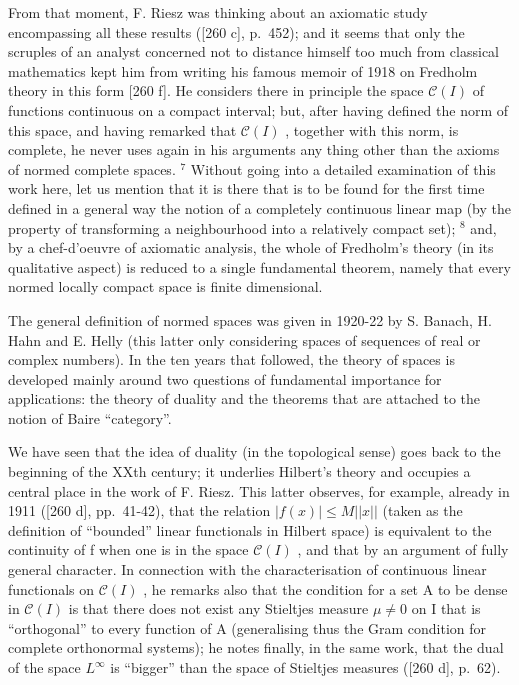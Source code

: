 From that moment, F. Riesz was thinking about an axiomatic study encompassing all these results ({[}260 c{]}, p.~452); and it seems that only the scruples of an analyst concerned not to distance himself too much from classical mathematics kept him from writing his famous memoir of 1918 on Fredholm theory in this form {[}260 f{]}. He considers there in principle the space \(\mathcal{C}(I)\) of functions continuous on a compact interval; but, after having defined the norm of this space, and having remarked that \(\mathcal{C}(I)\) , together with this norm, is complete, he never uses again in his arguments any thing other than the axioms of normed complete spaces. \(^{7}\) Without going into a detailed examination of this work here, let us mention that it is there that is to be found for the first time defined in a general way the notion of a completely continuous linear map (by the property of transforming a neighbourhood into a relatively compact set); \(^{8}\) and, by a chef-d'oeuvre of axiomatic analysis, the whole of Fredholm's theory (in its qualitative aspect) is reduced to a single fundamental theorem, namely that every normed locally compact space is finite dimensional.

The general definition of normed spaces was given in 1920-22 by S. Banach, H. Hahn and E. Helly (this latter only considering spaces of sequences of real or complex numbers). In the ten years that followed, the theory of spaces is developed mainly around two questions of fundamental importance for applications: the theory of duality and the theorems that are attached to the notion of Baire ``category''.

We have seen that the idea of duality (in the topological sense) goes back to the beginning of the XXth century; it underlies Hilbert's theory and occupies a central place in the work of F. Riesz. This latter observes, for example, already in 1911 ({[}260 d{]}, pp.~41-42), that the relation \(|f(x)| \leq M||x||\) (taken as the definition of ``bounded'' linear functionals in Hilbert space) is equivalent to the continuity of f when one is in the space \(\mathcal{C}(I)\) , and that by an argument of fully general character. In connection with the characterisation of continuous linear functionals on \(\mathcal{C}(I)\) , he remarks also that the condition for a set A to be dense in \(\mathcal{C}(I)\) is that there does not exist any Stieltjes measure \(\mu \neq 0\) on I that is ``orthogonal'' to every function of A (generalising thus the Gram condition for complete orthonormal systems); he notes finally, in the same work, that the dual of the space \(L^{\infty}\) is ``bigger'' than the space of Stieltjes measures ({[}260 d{]}, p.~62).

